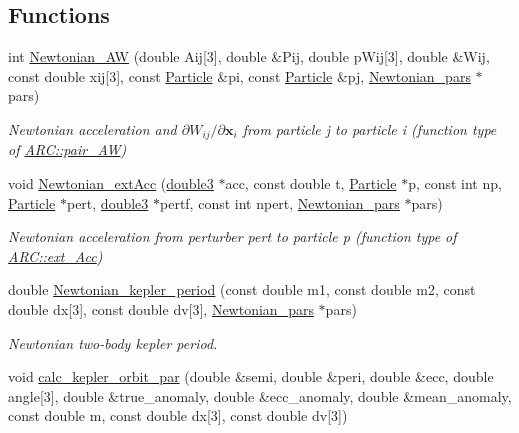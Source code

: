 \subsection*{Functions}
\begin{DoxyCompactItemize}
\item 
int \hyperlink{namespaceNTA_aad37ae368f0a920088e180a73187685a}{Newtonian\+\_\+\+AW} (double Aij\mbox{[}3\mbox{]}, double \&Pij, double p\+Wij\mbox{[}3\mbox{]}, double \&Wij, const double xij\mbox{[}3\mbox{]}, const \hyperlink{classParticle}{Particle} \&pi, const \hyperlink{classParticle}{Particle} \&pj, \hyperlink{classNTA_1_1Newtonian__pars}{Newtonian\+\_\+pars} $\ast$pars)
\begin{DoxyCompactList}\small\item\em Newtonian acceleration and $\partial W_{ij}/\partial \mathbf{x}_i$ from particle j to particle i (function type of \hyperlink{namespaceARC_a270b4c77765cacf073a5ef5f928f1d63}{A\+R\+C\+::pair\+\_\+\+AW}) \end{DoxyCompactList}\item 
void \hyperlink{namespaceNTA_a5b1a4fcaa09041cdf89a6b3122815c56}{Newtonian\+\_\+ext\+Acc} (\hyperlink{namespaceNTA_a19ccaac066849b26305dbbbee129fa0e}{double3} $\ast$acc, const double t, \hyperlink{classParticle}{Particle} $\ast$p, const int np, \hyperlink{classParticle}{Particle} $\ast$pert, \hyperlink{namespaceNTA_a19ccaac066849b26305dbbbee129fa0e}{double3} $\ast$pertf, const int npert, \hyperlink{classNTA_1_1Newtonian__pars}{Newtonian\+\_\+pars} $\ast$pars)
\begin{DoxyCompactList}\small\item\em Newtonian acceleration from perturber pert to particle p (function type of \hyperlink{namespaceARC_a7aeda3b3bd009af7ac964748834dd312}{A\+R\+C\+::ext\+\_\+\+Acc}) \end{DoxyCompactList}\item 
double \hyperlink{namespaceNTA_a5125fd91a773d67901c4e0f8896e3dca}{Newtonian\+\_\+kepler\+\_\+period} (const double m1, const double m2, const double dx\mbox{[}3\mbox{]}, const double dv\mbox{[}3\mbox{]}, \hyperlink{classNTA_1_1Newtonian__pars}{Newtonian\+\_\+pars} $\ast$pars)
\begin{DoxyCompactList}\small\item\em Newtonian two-\/body kepler period. \end{DoxyCompactList}\item 
void \hyperlink{namespaceNTA_a02d22f02e21004b264c8257a5ffbb600}{calc\+\_\+kepler\+\_\+orbit\+\_\+par} (double \&semi, double \&peri, double \&ecc, double angle\mbox{[}3\mbox{]}, double \&true\+\_\+anomaly, double \&ecc\+\_\+anomaly, double \&mean\+\_\+anomaly, const double m, const double dx\mbox{[}3\mbox{]}, const double dv\mbox{[}3\mbox{]})

\end{DoxyCompactItemize}
